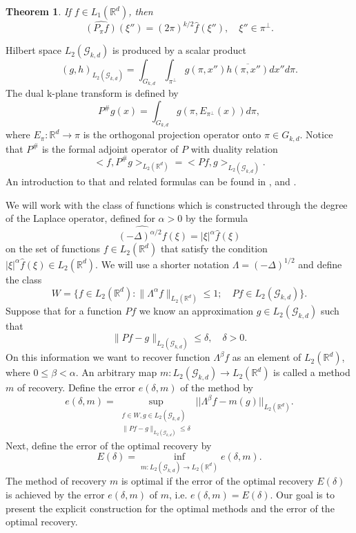 \documentclass[12pt]{iopart}
\newtheorem{theorem}{Theorem}
\begin{document}
	\begin{theorem}
		\label{projection}
		If $f\in L_1(\mathbb R^d)$, then
		$$\widehat{(P_\pi f)}(\xi'')=(2\pi)^{k/2}\widehat f(\xi''),\quad \xi''\in\pi^\perp.$$
	\end{theorem}
	Hilbert space $L_2(\mathcal G_{k,d})$ is produced by a scalar product	
	$$(g,h)_{L_2(\mathcal G_{k,d})}=\int_{G_{k,d}}\int_{\pi^\perp}g(\pi,x'')\overline{h(\pi,x'')}dx''d\pi.$$
	The dual k-plane transform is defined by
	$$P^\#g(x) = \int_{G_{k,d}}g(\pi,E_{\pi^\perp}(x))d\pi,$$
	where $E_\pi:\mathbb R^d\rightarrow\pi$ is the orthogonal projection operator onto $\pi\in G_{k,d}$.
	Notice that $P^\#$ is the formal adjoint operator of $P$ with duality relation
	\begin{equation}
	\label{duality}
	<f,P^\#g>_{L_2(\mathbb R^d)} = <Pf,g>_{L_2(\mathcal G_{k,d})}.
	\end{equation}
	An introduction to that and related formulas can be found in \cite{H},\cite{K} and \cite{MA}.
	
	We will work with the class of functions which is constructed through the degree of the Laplace operator, defined for $\alpha> 0$ by the formula 
	$$\widehat{(-\Delta)^{\alpha/2}f}(\xi)=|\xi|^\alpha \widehat f(\xi)$$ on the set of functions $f\in L_2(\mathbb R^d)$ that satisfy the condition $|\xi|^\alpha\widehat f(\xi)\in L_2(\mathbb R^d)$.
	We will use a shorter notation $\Lambda=(-\Delta)^{1/2}$ and define the class 
	$$ W=\{f\in L_2(\mathbb R^d) :
	\|\Lambda^\alpha f\|_{L_2(\mathbb R^d)}\leqslant  1;\quad Pf\in L_2(\mathcal G_{k,d}) \}.  $$
	Suppose that for a function $Pf$ we know an approximation $g\in L_2(\mathcal G_{k,d})$ such that
	$$\|Pf-g\|_{L_2(\mathcal G_{k,d})}\leqslant\delta, \quad\delta>0.$$
	On this information we want to recover function $\Lambda^\beta f$ as an element of $ L_2(\mathbb R^d)$, where $0\leqslant\beta<\alpha$. An arbitrary map $m:L_2(\mathcal G_{k,d})\rightarrow L_2(\mathbb R^d)$ is called a method $m$ of recovery. Define the error $e(\delta,m)$ of the method by
	\[
	e(\delta,m)=\sup_{
		\begin{smallmatrix}
		f\in W, g\in L_2(\mathcal G_{k,d})\\ 
		\|Pf-g\|_{L_2(\mathcal G_{k,d})}\leqslant \delta
		\end{smallmatrix}} ||\Lambda^\beta f-m(g)||_{L_2(\mathbb R^d)}.
	\] 
	Next, define the error of the optimal recovery by
	\begin{equation}
	\label{opter}
	E(\delta)=\inf_{m:L_2(\mathcal G_{k,d})\rightarrow L_2(\mathbb R^d)}e(\delta,m).
	\end{equation}
	The method of recovery $m$ is optimal if the error of the optimal recovery $E(\delta)$ is achieved by the error $e(\delta,m)$ of $m$, i.e. $e(\delta,m)=E(\delta)$. Our goal is to present the explicit construction for the optimal methods and the error of the optimal recovery.
	
\end{document}
